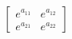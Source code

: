 \documentclass[preview]{standalone}
\begin{document}
\begin{align*}
\begin{bmatrix} e^{a_{11}} & e^{a_{12}} \\ e^{a_{21}} & e^{a_{22}} \end{bmatrix}
\end{align*}
\end{document}
